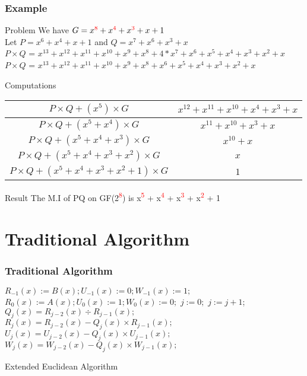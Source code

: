 \documentclass[12pt]{beamer}
\def\SP#1{\textsuperscript{\textcolor{red}{#1}}}
\begin{document}
\begin{frame}
\frametitle{Example}
\scriptsize
	\begin{block}{Problem}
		We have $G = x\SP{8} + x\SP{4} + x\SP{3} + x + 1$ \\
		Let $ P = x^{6} + x^{4} + x + 1$ and $Q = x^7 + x^6 + x^3 + x$\\
		$P \times Q$ = $x^{13} + x^{12} + x^{11} + x^{10} + x^{9} + x^{8} +  4 * x^{7} + x^{6} + x^{5} + x^{4}  + x^{3} + x^{2} + x$\\
		$P \times Q$ = $x^{13} + x^{12} + x^{11} + x^{10} + x^{9} + x^{8} + x^{6} + x^{5} + x^{4}  + x^{3} + x^{2} + x$\\
	\end{block}		
	\begin{block}{Computations}
	\begin{tabular}{|c|c|}
			\hline
			$P \times Q + (x^{5})\times G$ & $x^{12} + x^{11} + x^{10} + x^{4} + x^{3} + x$ \\ \hline
			$P \times Q + (x^{5} + x^{4})\times G$ & $x^{11} + x^{10} + x^{3} + x$ \\ \hline
			$P \times Q + (x^{5} + x^{4} + x^3)\times G$ & $x^{10} + x$ \\		\hline
			$P \times Q + (x^{5} + x^{4} + x^{3} + x^{2})\times G$ &  $x$ \\		\hline	
			$P \times Q + (x^{5} + x^{4} + x^{3} + x^{2} + 1)\times G$ &  $1$ \\	\hline
	\end{tabular}					
	\end{block}

	\begin{block}{Result}
		The M.I of PQ on GF(2\SP{8}) is x\SP{5} + x\SP{4} + x\SP{3} + x\SP{2} + 1		
	\end{block}
\end{frame}

\section{Traditional Algorithm}
\begin{frame}[fragile]
\frametitle{Traditional Algorithm}
\begin{algorithm}[H]
		\label{euclid}
		\begin{algorithmic}
			\scriptsize
				\State $R_{-1}(x) := B(x); U_{-1}(x) := 0; W_{-1}(x) := 1;$
				\State $R_{0}(x) := A(x); U_{0}(x) := 1; W_{0}(x) := 0;$
				\State $j := 0;$ 
					\State $j := j + 1$;
					\State $Q_{j}(x) = R_{j-2}(x) \div R_{j-1}(x);$
					\State $R_{j}(x) = R_{j-2}(x)  - Q_{j}(x) \times R_{j-1}(x);$
					\State $U_{j}(x) = U_{j-2}(x)  - Q_{j}(x) \times U_{j-1}(x);$
					\State $W_{j}(x) = W_{j-2}(x)  - Q_{j}(x) \times W_{j-1}(x);$					
				\EndWhile
			\EndProcedure
		\end{algorithmic}
		\caption{Extended Euclidean Algorithm}
	\end{algorithm}
\end{frame}
\end{document}
